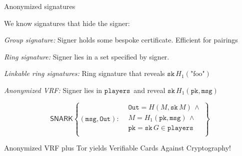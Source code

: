 \documentclass[fleqn,xcolor={usenames,dvipsnames},notes,aspectratio=169]{beamer} %
\newcommand{\algo}[1]{\ensuremath{\mathsf{#1}}}
\newcommand{\var}[1]{\ensuremath{\mathtt{#1}}}
\newcommand{\sk}{\var{sk}}
\newcommand{\pk}{\var{pk}}
\newcommand{\msg}{\var{msg}}
\newcommand{\In}{\ensuremath{M}}
\begin{document}
\begin{frame}[t]{Anonymized signatures}

We know signatures that hide the signer:

\medskip

\hspace*{3pt} {\em Group signature:} Signer holds some bespoke certificate. \quad Efficient for pairings

\medskip

\hspace*{3pt}  {\em Ring signature:} Signer lies in a set specified by signer. %

\medskip

\hspace*{3pt}  {\em Linkable ring signatures:} Ring signature that reveals $\sk \, H_1(\textrm{"foo"})$

\pause
\bigskip
\bigskip

{\em Anonymized VRF:} Signer lies in \var{players}\ and reveal $\sk \, H_1(\pk,\msg)$

\medskip

$$ \algo{SNARK} \left\{ (\msg,\var{Out}) : \begin{aligned}
 &\var{Out} = H( \In, \sk \, \In ) \,\land \\
 &\In = H_1(\pk,\msg)  \,\land \\
 &\pk = \sk \, G \in \var{players} \\
\end{aligned} \right\} $$

\bigskip

Anonymized VRF plus Tor yields Verifiable Cards Against Cryptography! \\ 

\medskip

\end{frame}
\end{document}
